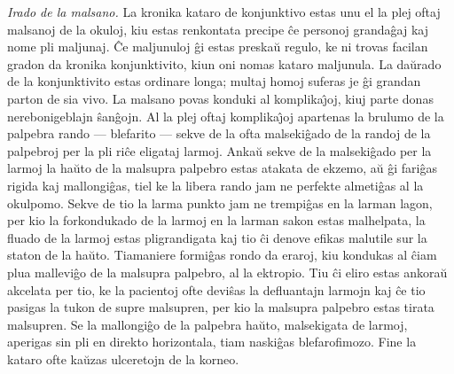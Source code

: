 {\sl Irado de la malsano.} La kronika kataro de konjunktivo estas
unu el la plej oftaj malsanoj de la okuloj, kiu estas renkontata
precipe \^ce personoj granda\^gaj kaj nome pli maljunaj. \^Ce
maljunuloj \^gi estas preska\u u regulo, ke ni trovas facilan gradon
da kronika konjunktivito, kiun oni nomas kataro maljunula. La da\u
urado de la konjunktivito estas ordinare longa; multaj homoj suferas
je \^gi grandan parton de sia vivo. La malsano povas konduki al
komplika\^{\j}oj, kiuj parte donas nerebonigeblajn \^san\^gojn. Al
la plej oftaj komplika\^{\j}oj apartenas la brulumo de la palpebra
rando --- blefarito --- sekve de la ofta malseki\^gado de la randoj
de la palpebroj per la pli ri\^ce eligataj larmoj. Anka\u u sekve de
la malseki\^gado per la larmoj la ha\u uto de la malsupra palpebro
estas atakata de ekzemo, a\u u \^gi fari\^gas rigida kaj
mallongi\^gas, tiel ke la libera rando jam ne perfekte almeti\^gas
al la okulpomo. Sekve de tio la larma punkto jam ne trempi\^gas en
la larman lagon, per kio la forkondukado de la larmoj en la larman
sakon estas malhelpata, la fluado de la larmoj estas pligrandigata
kaj tio \^ci denove efikas malutile sur la staton de la ha\u uto.
Tiamaniere formi\^gas rondo da eraroj, kiu kondukas al \^ciam plua
mallevi\^go de la malsupra palpebro, al la ektropio. Tiu \^ci eliro
estas ankora\u u akcelata per tio, ke la pacientoj ofte devi\^sas la
defluantajn larmojn kaj \^ce tio pasigas la tukon de supre
malsupren, per kio la malsupra palpebro estas tirata malsupren. Se
la mallongi\^go de la palpebra ha\u uto, malsekigata de larmoj,
aperigas sin pli en direkto horizontala, tiam naski\^gas
blefarofimozo. Fine la kataro ofte ka\u uzas ulceretojn de la
korneo.


